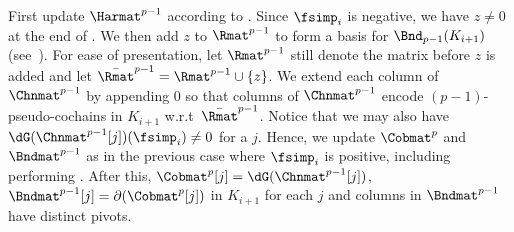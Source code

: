 

First update $\Harmat^{p-1}$ 
according to .
Since $\fsimp_i$ is negative, 
we have $z\neq 0$ at the end of .
We then add $z$ to $\Rmat^{p-1}$ 
to form a basis for $\Bnd_{p-1}(K_{i+1})$
(see~\cite{DeyWang2022,EdelsbrunnerLetscherZomorodian2002}).
For ease of presentation, 
let $\Rmat^{p-1}$ still denote 
the matrix
before $z$ is added
and let $\bar{\Rmat}^{p-1}=\Rmat^{p-1}\cup\{z\}$.
We extend each column 
of $\Chnmat^{p-1}$
by appending 0
so that columns of $\Chnmat^{p-1}$
encode $(p-1)$-pseudo-cochains in $K_{i+1}$
w.r.t\ $\bar{\Rmat}^{p-1}$.
Notice that we may also have
$\dG(\Chnmat^{p-1}[j])(\fsimp_i)\neq 0$
for a $j$.
Hence,
we update 
$\Cobmat^p$ and $\Bndmat^{p-1}$
as in the previous case where $\fsimp_i$ is positive,
including performing .
After this, 
${\Cobmat}^p[j]=\dG(\Chnmat^{p-1}[j])$, ${\Bndmat}^{p-1}[j]=\partial({\Cobmat}^p[j])$
in $K_{i+1}$
for each $j$
and columns in ${\Bndmat}^{p-1}$ have distinct pivots.


